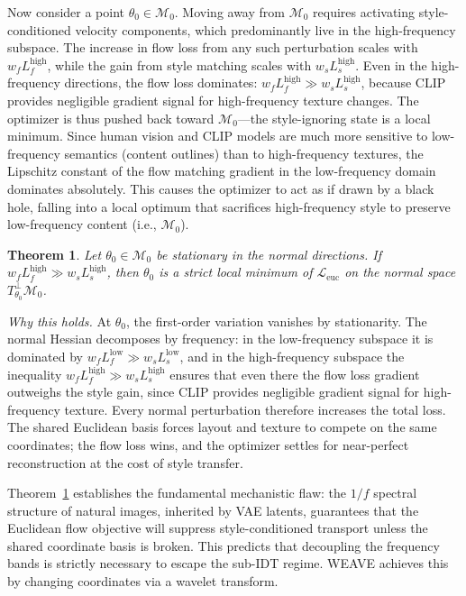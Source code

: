 \documentclass[letterpaper]{article}
\newtheorem{theorem}{Theorem}
\begin{document}
Now consider a point $\theta_0\in\mathcal M_0$. Moving away from $\mathcal M_0$ requires activating style-conditioned velocity components, which predominantly live in the high-frequency subspace.
The increase in flow loss from any such perturbation scales with $w_f L_f^{\mathrm{high}}$, while the gain from style matching scales with $w_s L_s^{\mathrm{high}}$.
Even in the high-frequency directions, the flow loss dominates: $w_f L_f^{\mathrm{high}} \gg w_s L_s^{\mathrm{high}}$, because CLIP provides negligible gradient signal for high-frequency texture changes.
The optimizer is thus pushed back toward $\mathcal M_0$---the style-ignoring state is a local minimum.
Since human vision and CLIP models are much more sensitive to low-frequency semantics (content outlines) than to high-frequency textures, the Lipschitz constant of the flow matching gradient in the low-frequency domain dominates absolutely. This causes the optimizer to act as if drawn by a black hole, falling into a local optimum that sacrifices high-frequency style to preserve low-frequency content (i.e., $\mathcal M_0$).

\begin{theorem}
\label{thm:attractor}
Let $\theta_0\in\mathcal M_0$ be stationary in the normal directions.
If $w_f L_f^{\mathrm{high}} \gg w_s L_s^{\mathrm{high}}$, then $\theta_0$ is a strict local minimum of $\mathcal L_{\mathrm{euc}}$ on the normal space $T_{\theta_0}^{\perp}\mathcal M_0$.
\end{theorem}

\textit{Why this holds.}
At $\theta_0$, the first-order variation vanishes by stationarity.
The normal Hessian decomposes by frequency: in the low-frequency subspace it is dominated by $w_f L_f^{\mathrm{low}} \gg w_s L_s^{\mathrm{low}}$, and in the high-frequency subspace the inequality $w_f L_f^{\mathrm{high}} \gg w_s L_s^{\mathrm{high}}$ ensures that even there the flow loss gradient outweighs the style gain, since CLIP provides negligible gradient signal for high-frequency texture.
Every normal perturbation therefore increases the total loss.
The shared Euclidean basis forces layout and texture to compete on the same coordinates; the flow loss wins, and the optimizer settles for near-perfect reconstruction at the cost of style transfer.

Theorem~\ref{thm:attractor} establishes the fundamental mechanistic flaw: the $1/f$ spectral structure of natural images, inherited by VAE latents, guarantees that the Euclidean flow objective will suppress style-conditioned transport unless the shared coordinate basis is broken.
This predicts that decoupling the frequency bands is strictly necessary to escape the sub-IDT regime.
WEAVE achieves this by changing coordinates via a wavelet transform.
\end{document}

